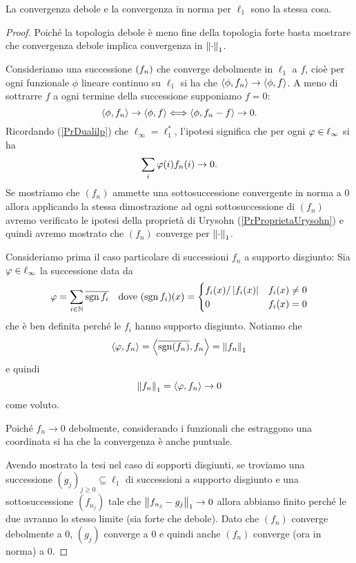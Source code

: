 \begin{proposition}\label{PrConvergenzaForteEDeboleCoincidonoSul1}
La convergenza debole e la convergenza in norma per $\ell_1$ sono la stessa cosa.
\end{proposition}
\begin{proof}
Poich\'e la topologia debole \`e meno fine della topologia forte basta mostrare che convergenza debole implica convergenza in ${\left\Vert{\cdot}\right\Vert}_1$.

Consideriamo una successione $\left({f_n}\right)$ che converge debolmente in $\ell_1$ a $f$, cio\`e per ogni funzionale $\phi$ lineare continuo su $\ell_1$ si ha che $\left\langle {\phi,f_n}\right\rangle\to\left\langle {\phi,f}\right\rangle$. A meno di sottrarre $f$ a ogni termine della successione supponiamo $f=0$:
\[\left\langle {\phi,f_n}\right\rangle\to \left\langle {\phi,f}\right\rangle\Longleftrightarrow \left\langle {\phi,f_n-f}\right\rangle\to 0.\]
Ricordando (\ref{PrDualilp}) che $\ell_\infty=\ell_1^\ast$, l'ipotesi significa che per ogni $\varphi\in\ell_\infty$ si ha
\[\sum_i\varphi(i)f_n(i)\to 0.\]
Se mostriamo che $(f_n)$ ammette una sottosuccessione convergente in norma a $0$ allora applicando la stessa dimostrazione ad ogni sottosuccessione di $(f_n)$ avremo verificato le ipotesi della propriet\`a di Urysohn (\ref{PrProprietaUrysohn}) e quindi avremo mostrato che $(f_n)$ converge per ${\left\Vert{\cdot}\right\Vert}_1$.

Consideriamo prima il caso particolare di successioni $f_n$ a supporto disgiunto: Sia $\varphi\in\ell_\infty$ la successione data da 
\[\varphi=\sum_{i\in\mathbb{N}} \overline{\operatorname{sgn} f_i}\quad\text{dove }(\operatorname{sgn} f_i)(x)=\begin{cases}
    f_i(x)/\left|{f_i(x)}\right| & f_i(x)\neq 0\\
    0 & f_i(x)=0
\end{cases}\]
che \`e ben definita perch\'e le $f_i$ hanno supporto disgiunto.
Notiamo che 
\[\left\langle {\varphi,f_n}\right\rangle=\left\langle {\overline{\operatorname{sgn}(f_n)},f_n}\right\rangle=\left\Vert{f_n}\right\Vert_1\] 
e quindi 
\[\left\Vert{f_n}\right\Vert_1=\left\langle {\varphi,f_n}\right\rangle\to 0\]
come voluto.

Poich\'e $f_n\to 0$ debolmente, considerando i funzionali che estraggono una coordinata si ha che la convergenza \`e anche puntuale. 

Avendo mostrato la tesi nel caso di sopporti disgiunti, se troviamo una successione $(g_j)_{j\geq 0}\subseteq \ell_1$ di successioni a supporto disgiunto e una sottosuccessione $(f_{n_j})$ tale che $\left\Vert{f_{n_j}-g_j}\right\Vert_1\to 0$ allora abbiamo finito perch\'e le due avranno lo stesso limite (sia forte che debole). Dato che $(f_n)$ converge debolmente a $0$, $(g_j)$ converge a $0$ e quindi anche $(f_n)$ converge (ora in norma) a $0$. 


\end{proof}

